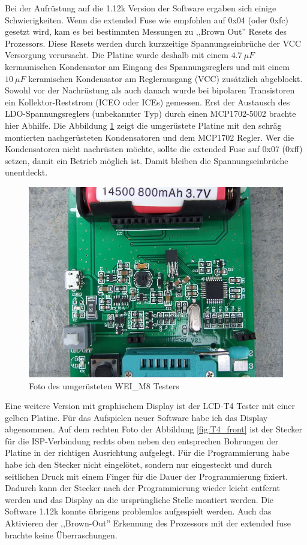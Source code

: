 Bei der Aufrüstung auf die 1.12k Version
der Software ergaben sich einige Schwierigkeiten. Wenn die extended Fuse wie empfohlen auf
0x04 (oder 0xfc) gesetzt wird, kam es bei bestimmten Messungen zu ,,Brown Out'' Resets des
Prozessors. Diese Resets werden durch kurzzeitige Spannungseinbrüche der VCC Versorgung
verursacht. Die Platine wurde deshalb mit einem \(4.7~\mu F\) kermamischen Kondensator
am Eingang des Spannungsreglers und mit einem \(10~\mu F\) keramischen Kondensator am
Reglerausgang (VCC) zusätzlich abgeblockt. Sowohl vor der Nachrüstung als auch danach
wurde bei bipolaren Transistoren ein Kollektor-Reststrom (ICEO oder ICEs) gemessen.
Erst der Austausch des LDO-Spannungsreglers (unbekannter Typ) durch einen MCP1702-5002
brachte hier Abhilfe. Die Abbildung \ref{fig:WeiM8mod} zeigt die umgerüstete Platine
mit den schräg montierten nachgerüsteten Kondensatoren und dem MCP1702 Regler.
Wer die Kondensatoren nicht nachrüsten möchte, sollte die extended Fuse auf 0x07 (0xff)
setzen, damit ein Betrieb möglich ist. Damit bleiben die Spannungseinbrüche unentdeckt.

\begin{figure}[H]
\centering
\includegraphics[width=12cm]{../PNG/WEI_M8_modified.JPG}
\caption{Foto des umgerüsteten WEI\_M8 Testers}
\label{fig:WeiM8mod}
\end{figure}

Eine weitere Version mit graphischem Display ist der LCD-T4 Tester mit einer gelben Platine.
Für das Aufspielen neuer Software habe ich das Display abgenommen.
Auf dem rechten Foto der Abbildung \ref{fig:T4_front} ist der Stecker für die ISP-Verbindung rechts oben
 neben den entsprechen Bohrungen der Platine in der richtigen Ausrichtung aufgelegt.
Für die Programmierung habe habe ich den Stecker nicht eingelötet, sondern nur eingesteckt und durch
seitlichen Druck mit einem Finger für die Dauer der Programmierung fixiert.
Dadurch kann der Stecker nach der Programmierung wieder leicht entfernt werden und das Display
an die ursprüngliche Stelle montiert werden.
Die Software 1.12k konnte übrigens problemlos aufgespielt werden.
Auch das Aktivieren der ,,Brown-Out'' Erkennung des Prozessors mit der extended fuse
brachte keine Überraschungen.

